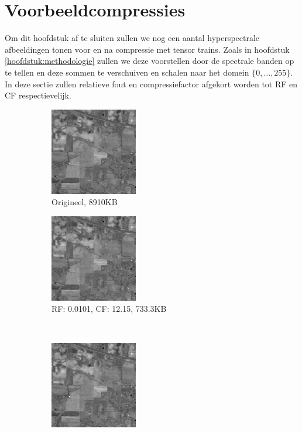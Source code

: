 \newpage
\section{Voorbeeldcompressies}

Om dit hoofdstuk af te sluiten zullen we nog een aantal hyperspectrale afbeeldingen tonen voor en na compressie met tensor trains. Zoals in hoofdstuk \ref{hoofdstuk:methodologie} zullen we deze voorstellen door de spectrale banden op te tellen en deze sommen te verschuiven en schalen naar het domein $\{0, \dots, 255\}$. In deze sectie zullen relatieve fout en compressiefactor afgekort worden tot RF en CF respectievelijk.

\begin{figure}[H]
\centering
\begin{subfigure}{0.48\textwidth}
  \centering
  \includegraphics[scale=1]{images/indian_pines_cropped_sum.png}
  \caption{Origineel, 8910KB}
\end{subfigure}
\begin{subfigure}{0.48\textwidth}
  \centering
  \includegraphics[scale=1]{images/example_compression_Indian_Pines_0_01.png}
  \caption{RF: 0.0101, CF: 12.15, 733.3KB}
\end{subfigure}
\\
\begin{subfigure}{0.48\textwidth}
  \centering
  \includegraphics[scale=1]{images/example_compression_Indian_Pines_0_025.png}

\end{subfigure}
\end{figure}
